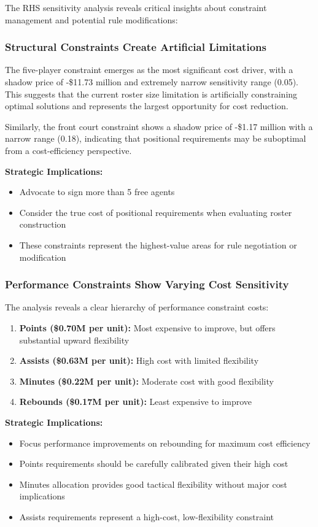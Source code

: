 \documentclass[a4paper,11pt]{article}
\begin{document}
The RHS sensitivity analysis reveals critical insights about constraint management and potential rule modifications:

\subsubsection{Structural Constraints Create Artificial Limitations}
The five-player constraint emerges as the most significant cost driver, with a shadow price of -\$11.73 million and extremely narrow sensitivity range (0.05). This suggests that the current roster size limitation is artificially constraining optimal solutions and represents the largest opportunity for cost reduction.

Similarly, the front court constraint shows a shadow price of -\$1.17 million with a narrow range (0.18), indicating that positional requirements may be suboptimal from a cost-efficiency perspective.

\textbf{Strategic Implications:}
\begin{itemize}
    \item Advocate to sign more than 5 free agents
    \item Consider the true cost of positional requirements when evaluating roster construction
    \item These constraints represent the highest-value areas for rule negotiation or modification
\end{itemize}

\subsubsection{Performance Constraints Show Varying Cost Sensitivity}
The analysis reveals a clear hierarchy of performance constraint costs:

\begin{enumerate}
    \item \textbf{Points (\$0.70M per unit):} Most expensive to improve, but offers substantial upward flexibility
    \item \textbf{Assists (\$0.63M per unit):} High cost with limited flexibility
    \item \textbf{Minutes (\$0.22M per unit):} Moderate cost with good flexibility
    \item \textbf{Rebounds (\$0.17M per unit):} Least expensive to improve
\end{enumerate}

\textbf{Strategic Implications:}
\begin{itemize}
    \item Focus performance improvements on rebounding for maximum cost efficiency
    \item Points requirements should be carefully calibrated given their high cost
    \item Minutes allocation provides good tactical flexibility without major cost implications
    \item Assists requirements represent a high-cost, low-flexibility constraint
\end{itemize}
\end{document}

